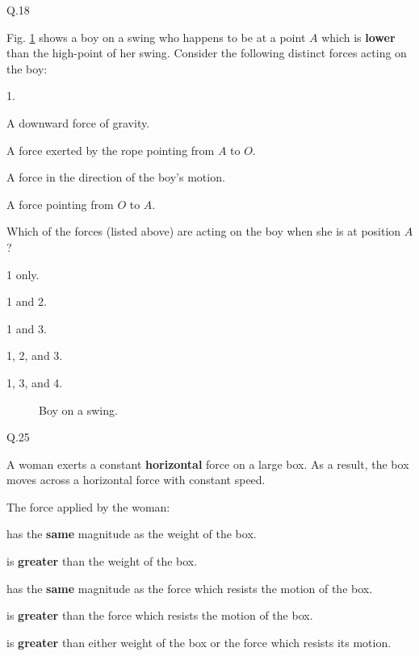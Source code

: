     \begin{mcq}{Q.18}{Fig. \ref{fig:swing} shows a boy on a swing who happens to be at a point $A$ which is \textbf{lower} than the high-point of her swing. Consider the following distinct forces acting on the boy:

        \eline[]
        \begin{options}{1.}
            \item A downward force of gravity.
            \item A force exerted by the rope pointing from $A$ to $O$.
            \item A force in the direction of the boy's motion.
            \item A force pointing from $O$ to $A$.
        \end{options}
        \eline[]

        Which of the forces (listed above) are acting on the boy when she is at position $A$?
    } 
        \item 1 only.
        \item 1 and 2.
        \item 1 and 3.
        \item 1, 2, and 3.
        \item 1, 3, and 4.
    \end{mcq}

    \begin{figure}[h!]
        \begin{center}
            
            \caption{\label{fig:swing} Boy on a swing.}
        \end{center}
    \end{figure}

    \begin{mcq}{Q.25}{A woman exerts a constant \textbf{horizontal} force on a large box. As a result, the box moves across a horizontal force with constant speed.
   
        \eline[]
        The force applied by the woman:
    }
        \item has the \textbf{same} magnitude as the weight of the box.
        \item is \textbf{greater} than the weight of the box.
        \item has the \textbf{same} magnitude as the force which resists the motion of the box.
        \item is \textbf{greater} than the force which resists the motion of the box.
        \item is \textbf{greater} than either weight of the box or the force which resists its motion.
    \end{mcq}

